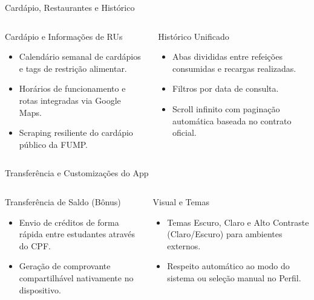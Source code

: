 \documentclass[10pt, aspectratio=169]{beamer}
\begin{document}
\begin{frame}{Cardápio, Restaurantes e Histórico}
  \begin{columns}[T,onlytextwidth]
      \begin{block}{Cardápio e Informações de RUs}
        \small
        \begin{itemize}
          \item Calendário semanal de cardápios e tags de restrição alimentar.
          \item Horários de funcionamento e rotas integradas via Google Maps.
          \item Scraping resiliente do cardápio público da FUMP.
        \end{itemize}
      \end{block}

      \begin{exampleblock}{Histórico Unificado}
        \small
        \begin{itemize}
          \item Abas divididas entre refeições consumidas e recargas realizadas.
          \item Filtros por data de consulta.
          \item Scroll infinito com paginação automática baseada no contrato oficial.
        \end{itemize}
      \end{exampleblock}
  \end{columns}
\end{frame}

\begin{frame}{Transferência e Customizações do App}
  \begin{columns}[T,onlytextwidth]
      \begin{block}{Transferência de Saldo (Bônus)}
        \small
        \begin{itemize}
          \item Envio de créditos de forma rápida entre estudantes através do CPF.
          \item Geração de comprovante compartilhável nativamente no dispositivo.
        \end{itemize}
      \end{block}

      \begin{exampleblock}{Visual e Temas}
        \small
        \begin{itemize}
          \item Temas Escuro, Claro e Alto Contraste (Claro/Escuro) para ambientes externos.
          \item Respeito automático ao modo do sistema ou seleção manual no Perfil.
        \end{itemize}
      \end{exampleblock}
  \end{columns}
\end{frame}
\end{document}
